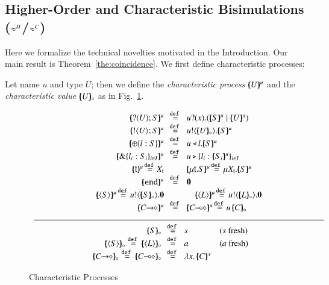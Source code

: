 \subsection{Higher-Order  and  
Characteristic  Bisimulations ($\approx^H$/$\approx^C$)}\label{ss:hwb}
\noi 

Here we formalize the technical novelties motivated in the Introduction.
Our main result is Theorem~\ref{the:coincidence}.
We first define characteristic processes:
\smallskip  
   
\begin{definition}\rm
\label{def:char}
	Let name $u$ and type $U$;
	then we define the {\em characteristic process} 
	$[\!\!(U)\!\!]^{u}$ and the {\em characteristic value}
	$[\!\!(U)\!\!]_{\circ}$ as
	in Fig.~\ref{fig:char}. 
\end{definition}

\smallskip

\begin{figure}[t]
	\[
	\begin{array}{c}
		\begin{array}{rclcl}
			\mapchar{\btinp{U} S}{u} &\!\!\defeq\!\!
& \binp{u}{x} (\mapchar{S}{u} \Par \mapchar{U}{x})
			\\
			\mapchar{\btout{U} S}{u} &\!\!\defeq\!\!& \bout{u}{\omapchar{U}} \mapchar{S}{u} %
			\\
			\mapchar{\btsel{l : S}}{u} &\!\!\defeq\!\!& \bsel{u}{l} \mapchar{S}{u}
			\\
			\mapchar{\btbra{l_i: S_i}_{i \in I}}{u} &\!\!\defeq\!\!& \bbra{u}{l_i: \mapchar{S_i}{u}}_{i \in I}
			\\
		\mapchar{\tvar{t}}{u} \!\defeq\! \varp{X}_{\vart{t}}
& & 
			\mapchar{\trec{t}{S}}{u} \!\defeq\! \recp{X_{\vart{t}}}{\mapchar{S}{u}}
			\\
			\mapchar{\tinact}{u} &\!\!\defeq\!\!& \inact
			\\
\mapchar{\chtype{S}}{u} \!\defeq\! \bout{u}{\omapchar{S}} \inact & & 
\quad\mapchar{\chtype{L}}{u} \!\defeq\! \bout{u}{\omapchar{L}} \inact
			\\
\mapchar{\shot{C}}{u} & \!\!\defeq\!\! & \mapchar{\lhot{C}}{u} \!\defeq\! 
\appl{u}{\omapchar{C}}
\end{array}
\\
\Hline
\\
		\begin{array}{rcll}
\omapchar{S} &\!\!\defeq\!\!& s & (s \textrm{ fresh})
			\\
\omapchar{\chtype{S}} \defeq \omapchar{\chtype{L}} &\!\!\defeq\!\!& a & 
(a \textrm{ fresh})\quad\quad
			\\
			\omapchar{\shot{C}} \defeq \omapchar{\lhot{C}} &\!\!\defeq\!\!& \abs{x}{\mapchar{C}{x}}
		\end{array}
	\end{array}
	\]
\caption{Characteristic Processes \label{fig:char}}
\Hline
\end{figure}

